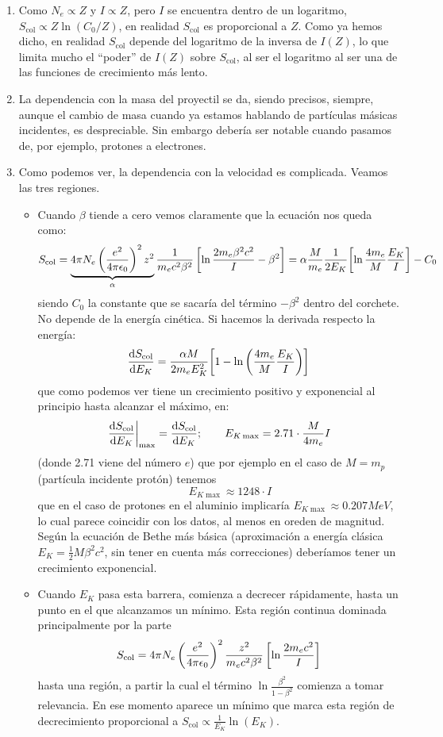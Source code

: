 \begin{enumerate}[label=\alph*)]
    \item Como $N_e \propto Z$ y $I \propto Z$, pero $I$ se encuentra dentro de un logaritmo, $S_{\text{col}} \propto Z \ln (C_0/Z)$, en realidad $S_{\text{col}}$ es proporcional a $Z$. Como ya hemos dicho, en realidad $S_{\text{col}}$ depende del logaritmo de la inversa de $I(Z)$, lo que limita mucho el ``poder'' de $I(Z)$ sobre $S_{\text{col}}$, al ser el logaritmo al ser una de las funciones de crecimiento más lento. 
    \item La dependencia con la masa del proyectil se da, siendo precisos, siempre, aunque el cambio de masa cuando ya estamos hablando de partículas másicas incidentes, es despreciable. Sin embargo debería ser notable cuando pasamos de, por ejemplo, protones a electrones. 
    \item Como podemos ver, la dependencia con la velocidad es complicada. Veamos las tres regiones.
    \begin{itemize}
        \item Cuando $\beta$ tiende a cero vemos claramente que la ecuación nos queda como: 
        \[
        S_\text{\text{col}} = \underbrace{4\pi N_e \left( \frac{e^2}{4\pi \epsilon_0} \right)^2 
        z^2}_{\alpha}\frac{1}{m_e c^2 \beta^2} 
        \left[ \ln \frac{2 m_e \beta^2 c^2}{I} - \beta^2 \right]  = \alpha \frac{M}{m_e} \frac{1}{2E_K} \bqty{\ln \frac{4m_e}{M}\frac{E_K}{I}} - C_0
        \] 
        siendo $C_0$ la constante que se sacaría del término $-\beta^2$ dentro del corchete. No depende de la energía cinética. Si hacemos la derivada respecto la energía: 
        \[
        \dv{S_{\text{col}}}{E_K} = \frac{\alpha M}{2m_e E_K^2} \bqty{ 1  - \ln \pqty{\frac{4m_e}{M}\frac{E_K}{I}}}
        \]
        que como podemos ver tiene un crecimiento positivo y exponencial al principio hasta alcanzar el máximo, en: 
        \[
        \left. \dv{S_{\text{col}}}{E_K}  \right|_{\max} =  \dv{S_{\text{col}}}{E_K} (E_{K\max}); \qquad E_{K\max} =2.71 \cdot  \frac{M}{4m_e} I
        \]
        (donde 2.71 viene del número $e$) que por ejemplo en el caso de $M=m_p$ (partícula incidente protón) tenemos
        \[ 
        \qquad E_{K\max} \approx 1248 \cdot I
        \]
        que en el caso de protones en el aluminio implicaría $E_{K\max} \approx 0.207 \unit{MeV}$, lo cual parece coincidir con los datos, al menos en oreden de magnitud. Según la ecuación de Bethe más básica (aproximación a energía clásica $E_K = \frac{1}{2} M\beta^2 c^2$, sin tener en cuenta más correcciones) deberíamos tener un crecimiento exponencial.
        \item Cuando $E_{K}$ pasa esta barrera, comienza a decrecer rápidamente, hasta un punto en el que alcanzamos un mínimo. Esta región continua dominada principalmente por la parte 
        \[
        S_\text{\text{col}} = 4\pi N_e \left( \frac{e^2}{4\pi \epsilon_0} \right)^2 
        \frac{z^2}{m_e c^2 \beta^2} 
        \left[ \ln \frac{2 m_e c^2}{I}  \right]
        \]
        hasta una región, a partir la cual el término $ \ln \frac{\beta^2}{1 - \beta^2} $ comienza a tomar relevancia. En ese momento aparece un mínimo que marca esta región de decrecimiento proporcional a $S_{\text{col}} \propto \frac{1}{E_K} \ln (E_K)$.        
        

\end{itemize}
\end{enumerate}

